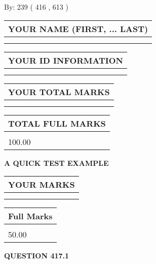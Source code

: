 \documentclass[12pt]{article}
\begin{document}
   
\hspace{1.0in} By: 
 239 ( 416 ,  613 )
   
   
   
   
\newpage 
\setcounter{page}{ 
   417001 } 
   
   
   
   
\noindent\begin{tabular}{|l|}
\hline
YOUR NAME (FIRST, ... LAST)  \\
\hline
 \\ 
 \\ 
\hline
\end{tabular}
\hspace{0.05in} \begin{tabular}{|l|}
\hline
 YOUR   ID   INFORMATION  \\
\hline
 \\ 
 \\ 
\hline
\end{tabular}
   
   
\vspace{0.2in}\noindent\begin{tabular}{|l|}
\hline
YOUR TOTAL MARKS  \\
\hline
 \\ 
 \\ 
\hline
\end{tabular}
\hspace{0.05in} \begin{tabular}{|l|}
\hline
TOTAL FULL MARKS  \\
\hline
 \\ 
100.00 \\
\hline
\end{tabular}
   
   
 \vspace{0.2in}
{\LARGE {\textbf{ A QUICK TEST EXAMPLE}}}
   
   
  
\vspace{0.2in}
  
\noindent\begin{tabular}{|l|}
\hline
 YOUR MARKS  \\
\hline
 \\ 
 \\ 
\hline
\end{tabular}
\hspace{0.05in} \begin{tabular}{|l|}
\hline
 Full Marks  \\
\hline
 \\ 
50.00 \\
\hline
\end{tabular}
{\textbf{\Large{QUESTION
417.1 
}}}
  
\end{document}
